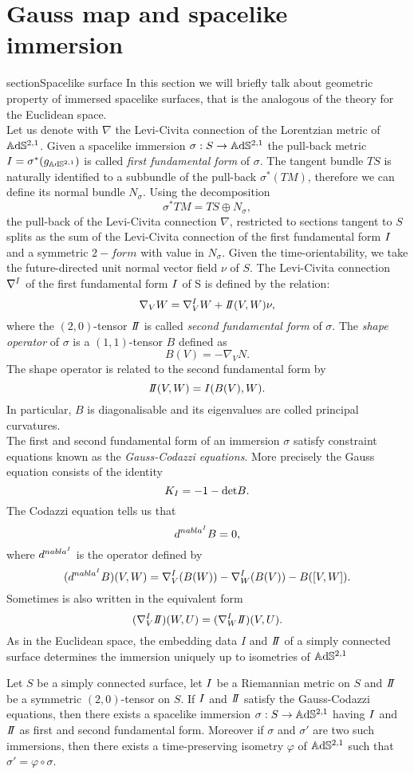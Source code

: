 \chapter{Gauss map and spacelike immersion}

section{Spacelike surface}
In this section we will briefly talk about geometric property of immersed spacelike surfaces, that is the analogous of the theory for the Euclidean space.\\
Let us denote with $\nabla$ the Levi-Civita connection of the Lorentzian metric of $\mathbb{A}\mathrm{d}\mathbb{S}^{2,1}$. Given a spacelike immersion $\sigma: S\to\mathbb{A}\mathrm{d}\mathbb{S}^{2,1}$ the pull-back metric $I = \sigma^*(g_{\mathbb{A}\mathrm{d}\mathbb{S}^{2,1}})$ is called \textit{first fundamental form} of $\sigma$.
The tangent bundle $TS$ is naturally identified to a subbundle of the pull-back $\sigma^*(TM)$, therefore we can define its normal bundle $N_\sigma$. Using the decomposition
\[
    \sigma^* TM = TS \oplus N_\sigma,
\]
the pull-back of the Levi-Civita connection $\nabla$, restricted to sections tangent to $S$ splits as the sum of the Levi-Civita connection of the first fundamental form $I$ and a symmetric $2-form$ with value in $N_\sigma$. Given the time-orientability, we take the future-directed unit normal vector field $\nu$ of $S$. The Levi-Civita connection $\nabla^I$ of the first fundamental form $I$ of S is defined by the relation:
\[
    \nabla_V W= \nabla^\I_V W + \II(V,W)\nu,
\] 
where the $(2,0)$-tensor $\II$ is called \textit{second fundamental form} of $\sigma$. The \textit{shape  operator} of $\sigma$ is a $(1,1)$-tensor $B$ defined as
\[
    B(V) = - \nabla_V N.
\]
The shape operator is related to the second fundamental form by
\[
    \II(V,W) = \I(B(V),W).
\]
In particular, $B$ is diagonalisable and its eigenvalues are colled principal curvatures.\\
The first and second fundamental form of an immersion $\sigma$ satisfy constraint equations known as the \textit{Gauss-Codazzi equations}. More precisely the Gauss equation consists of the identity
\[
    K_I = -1 - \text{det}B.
\]
The Codazzi equation tells us that
\[
    d^{nabla^I}B=0,
\]
where $d^{nabla^I}$ is the operator defined by
\[
    (d^{nabla^I}B)(V,W) = \nabla^I_V(B(W)) - \nabla^I_W(B(V)) - B([V,W]).
\]
Sometimes is also written in the equivalent form 
\[
    (\nabla^\I_V \II)(W,U) = (\nabla^\I_W \II)(V,U).
\]
As in the Euclidean space, the embedding data $I$ and $\II$ of a simply connected surface determines the immersion uniquely up to isometries of $\mathbb{A}\mathrm{d}\mathbb{S}^{2,1}$
\begin{theorem}
    Let $S$ be a simply connected surface, let $I$ be a Riemannian metric on $S$ and $\II$ be a symmetric $(2,0)$-tensor on $S$. If $I$ and $\II$ satisfy the Gauss-Codazzi equations, then there exists a spacelike immersion $\sigma:S \to\mathbb{A}\mathrm{d}\mathbb{S}^{2,1}$ having $I$ and $\II$ as first and second fundamental form. Moreover if $\sigma$ and $\sigma'$ are two such immersions, then there exists a time-preserving isometry $\varphi$ of $\mathbb{A}\mathrm{d}\mathbb{S}^{2,1}$ such that $\sigma' = \varphi \circ \sigma$.
\end{theorem}

